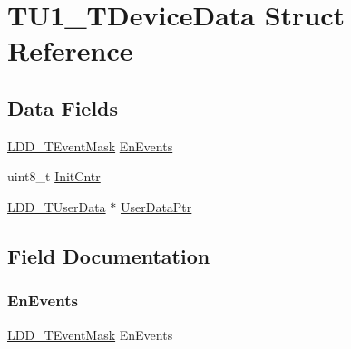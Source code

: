 \hypertarget{struct_t_u1___t_device_data}{}\section{T\+U1\+\_\+\+T\+Device\+Data Struct Reference}
\label{struct_t_u1___t_device_data}
\subsection*{Data Fields}
\begin{DoxyCompactItemize}
\item 
\hyperlink{group___p_e___types__module_gafbe7f4d4e51560399c3bdd0218584533}{L\+D\+D\+\_\+\+T\+Event\+Mask} \hyperlink{struct_t_u1___t_device_data_a694136333d74d574920faa3dca1b8995}{En\+Events}
\item 
uint8\+\_\+t \hyperlink{struct_t_u1___t_device_data_a7931edcdc112463f3a5af2de3518c2ba}{Init\+Cntr}
\item 
\hyperlink{group___p_e___types__module_ga0b66a73f87238a782318aa0be7578e35}{L\+D\+D\+\_\+\+T\+User\+Data} $\ast$ \hyperlink{struct_t_u1___t_device_data_a8e77b9d030b00c231823350a904e0f83}{User\+Data\+Ptr}
\end{DoxyCompactItemize}


\subsection{Field Documentation}
\mbox{\label{struct_t_u1___t_device_data_a694136333d74d574920faa3dca1b8995}} 
\subsubsection{\texorpdfstring{En\+Events}{EnEvents}}
{\footnotesize\ttfamily \hyperlink{group___p_e___types__module_gafbe7f4d4e51560399c3bdd0218584533}{L\+D\+D\+\_\+\+T\+Event\+Mask} En\+Events}

\mbox{\label{struct_t_u1___t_device_data_a7931edcdc112463f3a5af2de3518c2ba}} 
